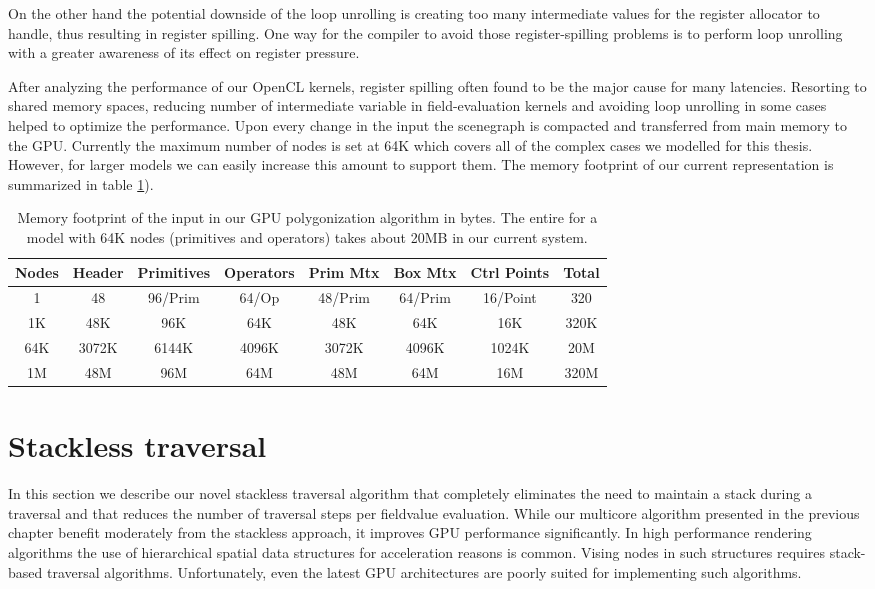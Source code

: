 On the other hand the potential downside of the loop unrolling is creating too many intermediate values for the register allocator to handle, thus resulting in 
register spilling. One way for the compiler to avoid those register-spilling problems is to perform loop unrolling with a greater awareness of its effect on register 
pressure. 

After analyzing the performance of our OpenCL kernels, register spilling often found to be the major cause for many latencies. Resorting to shared memory spaces, reducing 
number of intermediate variable in field-evaluation kernels and avoiding loop unrolling in some cases helped to optimize the performance. Upon every
change in the input \blob the scenegraph is compacted and transferred from main memory to the GPU. Currently the maximum number of nodes is set at 64K which covers
all of the complex cases we modelled for this thesis. However, for larger \blob models  we can easily increase this amount to support them. The memory footprint of 
our current \blob representation is summarized in table \ref{table:memfootprint}).

\begin{table}[H]
\begin{center}
	 \caption{\label{table:memfootprint}
  {Memory footprint of the input \blob in our GPU polygonization algorithm in bytes. The entire \blob for a model with 64K nodes (primitives and operators) 
  takes about 20MB in our current system.}
}
  \begin{tabular}{ | c | c | c | c | c | c | c | c |}
    \hline    
    Nodes & Header & Primitives & Operators & Prim Mtx & Box Mtx & Ctrl Points & Total \\ \hline \hline
    1 & 48 & 96/Prim & 64/Op & 48/Prim & 64/Prim & 16/Point & 320 \\ \hline
    1K & 48K & 96K & 64K & 48K & 64K & 16K & 320K \\ \hline
    64K & 3072K & 6144K & 4096K & 3072K & 4096K & 1024K & 20M \\ \hline
    1M & 48M & 96M & 64M & 48M & 64M & 16M & 320M \\ 
    \hline
  	\end{tabular}
\end{center}
\end{table}


\section{Stackless \blob traversal}
In this section we describe our novel stackless \blob traversal algorithm that completely eliminates the need to maintain a stack during a \blob
traversal and that reduces the number of traversal steps per fieldvalue evaluation. While our multicore algorithm presented in the previous chapter 
benefit moderately from the stackless approach, it improves GPU performance significantly. In high performance rendering algorithms the use of 
hierarchical spatial data structures for acceleration reasons is common. Vising nodes in such structures requires stack-based traversal 
algorithms. Unfortunately, even the latest GPU architectures are poorly suited for implementing such algorithms. 


